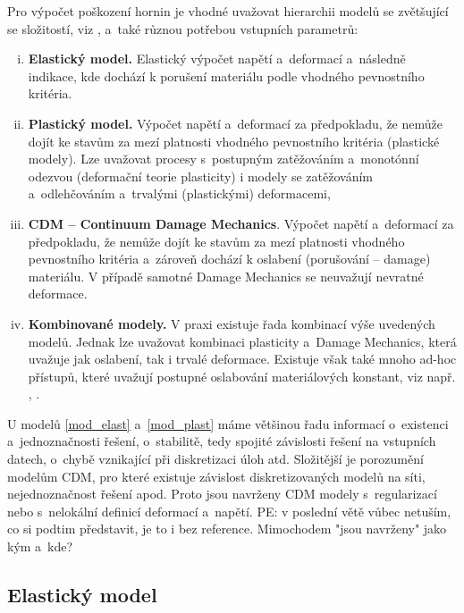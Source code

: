 \documentclass{article}
\newcommand{\pe}[1]{{\color{orange} PE: #1}}
\begin{document}
Pro výpočet poškození hornin je vhodné uvažovat hierarchii modelů se zvětšující se složitostí, viz \cite{Blaheta2013a}, a~také různou potřebou vstupních parametrů:
\begin{enumerate}[(i)]
	\item \label{mod_elast} {\bf Elastický model.} Elastický výpočet napětí a~deformací a~následně indikace, kde dochází k porušení materiálu podle vhodného pevnostního kritéria.
	\item \label{mod_plast} {\bf Plastický model.} Výpočet napětí a~deformací za předpokladu, že nemůže dojít ke stavům za mezí platnosti vhodného pevnostního kritéria (plastické modely). Lze uvažovat procesy s~postupným zatěžováním a~monotónní odezvou (deformační teorie plasticity) i modely se zatěžováním a~odlehčováním a~trvalými (plastickými) deformacemi,
	\item \label{mod_damage} {\bf CDM -- Continuum Damage Mechanics}. Výpočet napětí a~deformací za předpokladu, že nemůže dojít ke stavům za mezí platnosti vhodného pevnostního kritéria a~zároveň dochází k oslabení (porušování --  damage) materiálu. V případě samotné Damage Mechanics se neuvažují nevratné deformace.
	\item \label{mod_irev_cdm} {\bf Kombinované modely.} V praxi existuje řada kombinací výše uvedených modelů. Jednak lze uvažovat kombinaci plasticity a~Damage Mechanics, která uvažuje jak oslabení, tak i trvalé deformace. Existuje však také mnoho ad-hoc přístupů, které uvažují postupné oslabování materiálových konstant, viz např. \cite{Perras2016}, \cite{Carranza-Torres1999}.
\end{enumerate}
U modelů \eqref{mod_elast} a~\eqref{mod_plast} máme většinou řadu informací o~existenci a~jednoznačnosti
řešení, o~stabilitě, tedy spojité závislosti řešení na vstupních datech, o~chybě vznikající  při  diskretizaci  úloh  atd.  Složitější je porozumění  modelům CDM, pro které existuje závislost diskretizovaných  modelů na  síti, nejednoznačnost řešení  apod. Proto jsou navrženy CDM modely s~regularizací nebo s~nelokální definicí deformací a~napětí. \pe{v poslední větě vůbec netuším, co si podtim představit, je to i bez reference. Mimochodem "jsou navrženy" jako kým a~kde?}



\subsection{Elastický model}
\end{document}
